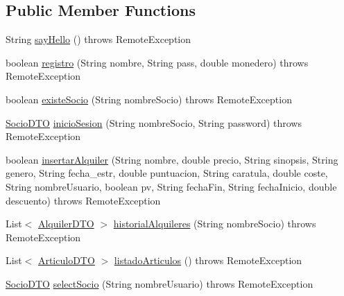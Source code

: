 \subsection*{Public Member Functions}
\begin{DoxyCompactItemize}
\item 
String \mbox{\hyperlink{interfacees_1_1deusto_1_1server_1_1remote_1_1_i_server_a9a2ee16746baf359dc7ac1fc4437eee8}{say\+Hello}} ()  throws Remote\+Exception
\item 
boolean \mbox{\hyperlink{interfacees_1_1deusto_1_1server_1_1remote_1_1_i_server_ac293a07e02b5c832d25954fbbec4d92c}{registro}} (String nombre, String pass, double monedero)  throws Remote\+Exception
\item 
boolean \mbox{\hyperlink{interfacees_1_1deusto_1_1server_1_1remote_1_1_i_server_a9c3a20fd809291100bd8c3259a857d2b}{existe\+Socio}} (String nombre\+Socio)  throws Remote\+Exception
\item 
\mbox{\hyperlink{classes_1_1deusto_1_1server_1_1dto_1_1_socio_d_t_o}{Socio\+D\+TO}} \mbox{\hyperlink{interfacees_1_1deusto_1_1server_1_1remote_1_1_i_server_a0815847d37ff0d87f0c2bdd8202b48bb}{inicio\+Sesion}} (String nombre\+Socio, String password)  throws Remote\+Exception
\item 
boolean \mbox{\hyperlink{interfacees_1_1deusto_1_1server_1_1remote_1_1_i_server_adc798ebfbd387dc7ef9c8d86a37eb3bb}{insertar\+Alquiler}} (String nombre, double precio, String sinopsis, String genero, String fecha\+\_\+estr, double puntuacion, String caratula, double coste, String nombre\+Usuario, boolean pv, String fecha\+Fin, String fecha\+Inicio, double descuento)  throws Remote\+Exception
\item 
List$<$ \mbox{\hyperlink{classes_1_1deusto_1_1server_1_1dto_1_1_alquiler_d_t_o}{Alquiler\+D\+TO}} $>$ \mbox{\hyperlink{interfacees_1_1deusto_1_1server_1_1remote_1_1_i_server_ab6d4eec966b0e54e1b82c037dee7da23}{historial\+Alquileres}} (String nombre\+Socio)  throws Remote\+Exception
\item 
List$<$ \mbox{\hyperlink{classes_1_1deusto_1_1server_1_1dto_1_1_articulo_d_t_o}{Articulo\+D\+TO}} $>$ \mbox{\hyperlink{interfacees_1_1deusto_1_1server_1_1remote_1_1_i_server_ac764551111551c2b167bf3d0fb53fc7b}{listado\+Articulos}} ()  throws Remote\+Exception
\item 
\mbox{\hyperlink{classes_1_1deusto_1_1server_1_1dto_1_1_socio_d_t_o}{Socio\+D\+TO}} \mbox{\hyperlink{interfacees_1_1deusto_1_1server_1_1remote_1_1_i_server_a5268c08f2dd59d8ebc3864f7345c12f3}{select\+Socio}} (String nombre\+Usuario)  throws Remote\+Exception

\end{DoxyCompactItemize}
